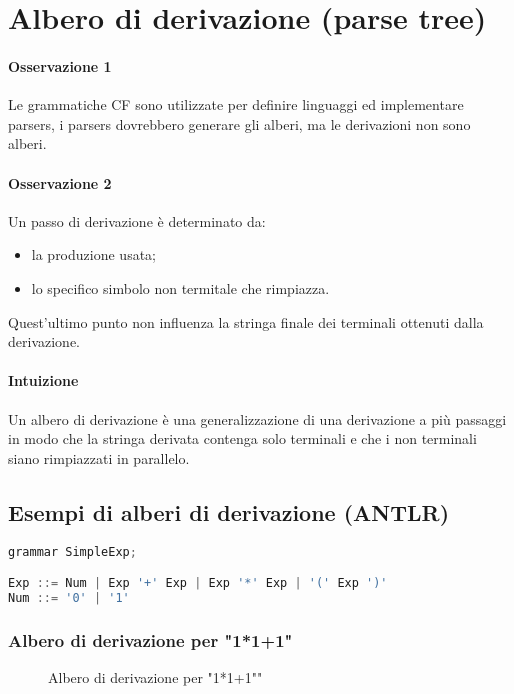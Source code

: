 \section{Albero di derivazione (parse tree)}
\paragraph{Osservazione 1}
Le grammatiche CF sono utilizzate per definire linguaggi ed implementare
parsers, i parsers dovrebbero generare gli alberi, ma le derivazioni non
sono alberi.

\paragraph{Osservazione 2}
Un passo di derivazione è determinato da:
\begin{itemize}
  \item la produzione usata;
  \item lo specifico simbolo non termitale che rimpiazza.
\end{itemize}
Quest'ultimo punto non influenza la stringa finale dei terminali ottenuti
dalla derivazione.

\paragraph{Intuizione}
Un albero di derivazione è una generalizzazione di una derivazione a più
passaggi in modo che la stringa derivata contenga solo terminali e che i non
terminali siano rimpiazzati in parallelo.

\subsection{Esempi di alberi di derivazione (ANTLR)}
\begin{lstlisting}[language=Java, caption={Grammatica ANTLR}]
grammar SimpleExp;

Exp ::= Num | Exp '+' Exp | Exp '*' Exp | '(' Exp ')'
Num ::= '0' | '1'
\end{lstlisting}

\subsubsection{Albero di derivazione per "1*1+1"}
\begin{figure}[h]
    \centering
    \caption{Albero di derivazione per "1*1+1""}
    \label{fig:dtree-1}
\end{figure}

